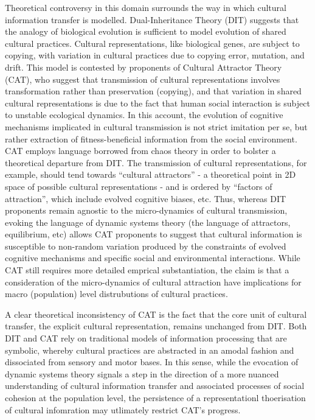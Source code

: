\documentclass[12pt]{report}
\begin{document}
Theoretical controversy in this domain surrounds the way in which cultural information transfer is modelled.  Dual-Inheritance Theory (DIT) suggests that the analogy of biological evolution is sufficient to model evolution of shared cultural practices. Cultural representations, like biological genes, are subject to copying, with variation in cultural practices due to copying error, mutation, and drift. This model is contested by proponents of Cultural Attractor Theory (CAT), who suggest that transmission of cultural representations involves transformation rather than preservation (copying), and that variation in shared cultural representations is due to the fact that human social interaction is subject to unstable ecological dynamics.  In this account,  the evolution of cognitive mechanisms implicated in cultural transmission is not strict imitation per se, but rather extraction of fitness-beneficial information from the social environment. CAT employs language borrowed from chaos theory in order to bolster a theoretical departure from DIT. The transmission of cultural representations, for example, should tend towards ``cultural attractors'' - a theoretical point in 2D space of possible cultural representations - and is ordered by ``factors of attraction'', which include evolved cognitive biases, etc.  Thus, whereas DIT proponents remain agnostic to the micro-dynamics of cultural transmission, evoking the language of dynamic systems theory (the language of attractors, equilibrium, etc) allows CAT proponents to suggest that cultural information is susceptible to non-random variation produced by the constraints of evolved cognitive mechanisms and specific social and environmental interactions.  While CAT still requires more detailed emprical substantiation, the claim is that a consideration of the micro-dynamics of cultural attraction have implications for macro (population) level distrubutions of cultural practices.

A clear theoretical inconsistency of CAT is the fact that the core unit of cultural transfer, the explicit cultural representation, remains unchanged from DIT.  Both DIT and CAT rely on traditional models of information processing that are symbolic, whereby cultural practices are abstracted in an amodal fashion and dissociated from sensory and motor bases.  In this sense, while the evocation of dynamic systems theory signals a step in the direction of a more nuanced understanding of cultural information transfer and associated processes of social cohesion at the population level, the persistence of a representationl thoerisation of cultural infomration may utlimately restrict CAT's progress.
\end{document}
